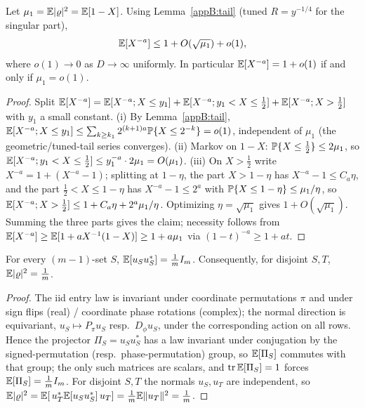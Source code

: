 \begin{proposition}[Assembly: the bar is $\EE|\varrho|^2=o(1)$]\label{appB:assembly}
Let $\mu_1=\mathbb{E}|\varrho|^2=\mathbb{E}[1-X]$.  Using Lemma~\ref{appB:tail} (tuned $R=y^{-1/4}$ for the
singular part),
\[
  \mathbb{E}[X^{-a}]\le 1+O(\sqrt{\mu_1})+o(1),
\]
where $o(1)\to0$ as $D\to\infty$ uniformly.  In particular $\mathbb{E}[X^{-a}]=1+o(1)$ if and only if
$\mu_1=o(1)$.
\end{proposition}

\begin{proof}
Split $\mathbb{E}[X^{-a}]=\mathbb{E}[X^{-a};X\le y_1]+\mathbb{E}[X^{-a};y_1<X\le\tfrac12]+\mathbb{E}[X^{-a};X>\tfrac12]$ with
$y_1$ a small constant.  (i) By Lemma~\ref{appB:tail}, $\mathbb{E}[X^{-a};X\le y_1]\le\sum_{k\ge k_1}
2^{(k+1)a}\mathbb{P}\{X\le2^{-k}\}=o(1)$, independent of $\mu_1$ (the geometric/tuned-tail series
converges).  (ii) Markov on $1-X$: $\mathbb{P}\{X\le\tfrac12\}\le2\mu_1$, so
$\mathbb{E}[X^{-a};y_1<X\le\tfrac12]\le y_1^{-a}\cdot2\mu_1=O(\mu_1)$.  (iii) On $X>\tfrac12$ write
$X^{-a}=1+(X^{-a}-1)$; splitting at $1-\eta$, the part $X>1-\eta$ has $X^{-a}-1\le C_a\eta$, and the
part $\tfrac12<X\le1-\eta$ has $X^{-a}-1\le2^a$ with $\mathbb{P}\{X\le1-\eta\}\le\mu_1/\eta$, so
$\mathbb{E}[X^{-a};X>\tfrac12]\le1+C_a\eta+2^a\mu_1/\eta$.  Optimizing $\eta=\sqrt{\mu_1}$ gives
$1+O(\sqrt{\mu_1})$.  Summing the three parts gives the claim; necessity follows from
$\mathbb{E}[X^{-a}]\ge\mathbb{E}[1+aX^{-1}(1-X)]\ge1+a\mu_1$ via $(1-t)^{-a}\ge1+at$.
\end{proof}

\begin{proposition}\label{appB:disjoint}
For every $(m-1)$-set $S$, $\mathbb{E}[u_Su_S^*]=\tfrac1m I_m$.  Consequently, for disjoint $S,T$,
$\mathbb{E}|\varrho|^2=\tfrac1m$.
\end{proposition}

\begin{proof}
The iid entry law is invariant under coordinate permutations $\pi$ and under sign flips (real) /
coordinate phase rotations (complex); the normal direction is equivariant, $u_{S}\mapsto P_\pi u_S$
resp.\ $D_\phi u_S$, under the corresponding action on all rows.  Hence the projector
$\Pi_S=u_Su_S^*$ has a law invariant under conjugation by the signed-permutation (resp.\
phase-permutation) group, so $\mathbb{E}[\Pi_S]$ commutes with that group; the only such matrices are
scalars, and $\operatorname{tr}\mathbb{E}[\Pi_S]=1$ forces $\mathbb{E}[\Pi_S]=\tfrac1m I_m$.  For disjoint $S,T$ the normals
$u_S,u_T$ are independent, so $\mathbb{E}|\varrho|^2=\mathbb{E}[\,u_T^*\mathbb{E}[u_Su_S^*]\,u_T]=\tfrac1m\mathbb{E}\|u_T\|^2=\tfrac1m$.
\end{proof}

